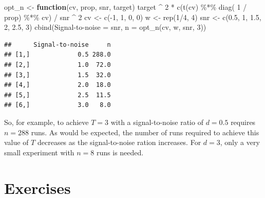 \documentclass[
]{book}
\newenvironment{Shaded}{\begin{snugshade}}{\end{snugshade}}
\newcommand{\ControlFlowTok}[1]{\textcolor[rgb]{0.13,0.29,0.53}{\textbf{#1}}}
\newcommand{\DecValTok}[1]{\textcolor[rgb]{0.00,0.00,0.81}{#1}}
\newcommand{\FloatTok}[1]{\textcolor[rgb]{0.00,0.00,0.81}{#1}}
\newcommand{\FunctionTok}[1]{\textcolor[rgb]{0.00,0.00,0.00}{#1}}
\newcommand{\NormalTok}[1]{#1}
\newcommand{\OtherTok}[1]{\textcolor[rgb]{0.56,0.35,0.01}{#1}}
\newcommand{\SpecialCharTok}[1]{\textcolor[rgb]{0.00,0.00,0.00}{#1}}
\newcommand{\StringTok}[1]{\textcolor[rgb]{0.31,0.60,0.02}{#1}}
\theoremstyle{definition}
\theoremstyle{definition}
\theoremstyle{definition}
\theoremstyle{definition}
\theoremstyle{remark}
\begin{document}
\begin{Shaded}
\begin{Highlighting}[]
\NormalTok{opt\_n }\OtherTok{\textless{}{-}} \ControlFlowTok{function}\NormalTok{(cv, prop, snr, target) target }\SpecialCharTok{\^{}} \DecValTok{2} \SpecialCharTok{*} \FunctionTok{c}\NormalTok{(}\FunctionTok{t}\NormalTok{(cv) }\SpecialCharTok{\%*\%} \FunctionTok{diag}\NormalTok{( }\DecValTok{1} \SpecialCharTok{/}\NormalTok{ prop) }\SpecialCharTok{\%*\%}\NormalTok{ cv) }\SpecialCharTok{/}\NormalTok{ snr }\SpecialCharTok{\^{}} \DecValTok{2}
\NormalTok{cv }\OtherTok{\textless{}{-}} \FunctionTok{c}\NormalTok{(}\SpecialCharTok{{-}}\DecValTok{1}\NormalTok{, }\DecValTok{1}\NormalTok{, }\DecValTok{0}\NormalTok{, }\DecValTok{0}\NormalTok{)}
\NormalTok{w }\OtherTok{\textless{}{-}} \FunctionTok{rep}\NormalTok{(}\DecValTok{1}\SpecialCharTok{/}\DecValTok{4}\NormalTok{, }\DecValTok{4}\NormalTok{)}
\NormalTok{snr }\OtherTok{\textless{}{-}} \FunctionTok{c}\NormalTok{(}\FloatTok{0.5}\NormalTok{, }\DecValTok{1}\NormalTok{, }\FloatTok{1.5}\NormalTok{, }\DecValTok{2}\NormalTok{, }\FloatTok{2.5}\NormalTok{, }\DecValTok{3}\NormalTok{)}
\FunctionTok{cbind}\NormalTok{(}\StringTok{\textquotesingle{}Signal{-}to{-}noise\textquotesingle{}} \OtherTok{=}\NormalTok{ snr, }\StringTok{\textquotesingle{}n\textquotesingle{}} \OtherTok{=} \FunctionTok{opt\_n}\NormalTok{(cv, w, snr, }\DecValTok{3}\NormalTok{))}
\end{Highlighting}
\end{Shaded}

\begin{verbatim}
##      Signal-to-noise     n
## [1,]             0.5 288.0
## [2,]             1.0  72.0
## [3,]             1.5  32.0
## [4,]             2.0  18.0
## [5,]             2.5  11.5
## [6,]             3.0   8.0
\end{verbatim}

So, for example, to achieve \(T = 3\) with a signal-to-noise ratio of \(d=0.5\) requires \(n=288\) runs. As would be expected, the number of runs required to achieve this value of \(T\) decreases as the signal-to-noise ration increases. For \(d=3\), only a very small experiment with \(n=8\) runs is needed.

\hypertarget{exercises-1}{%
\section{Exercises}\label{exercises-1}}
\end{document}
